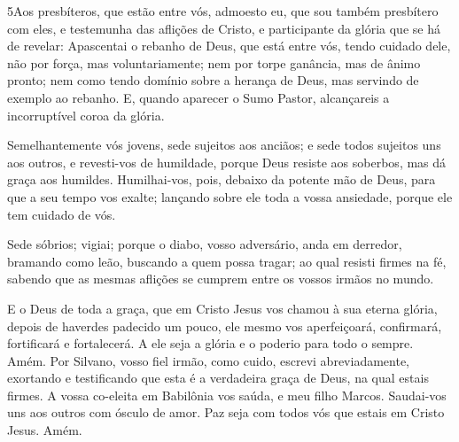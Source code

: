 \medskip

\lettrine{5} Aos presbíteros, que estão entre vós, admoesto
eu, que sou também presbítero com eles, e testemunha das aflições de
Cristo, e participante da glória que se há de revelar:
Apascentai o rebanho de Deus, que está entre vós, tendo cuidado
dele, não por força, mas voluntariamente; nem por torpe ganância,
mas de ânimo pronto; nem como tendo domínio sobre a herança de
Deus, mas servindo de exemplo ao rebanho. E, quando aparecer o
Sumo Pastor, alcançareis a incorruptível coroa da glória.

Semelhantemente vós jovens, sede sujeitos aos anciãos; e sede
todos sujeitos uns aos outros, e revesti-vos de humildade, porque
Deus resiste aos soberbos, mas dá graça aos humildes.
Humilhai-vos, pois, debaixo da potente mão de Deus, para que a
seu tempo vos exalte; lançando sobre ele toda a vossa ansiedade,
porque ele tem cuidado de vós.

Sede sóbrios; vigiai; porque o diabo, vosso adversário, anda em
derredor, bramando como leão, buscando a quem possa tragar; ao
qual resisti firmes na fé, sabendo que as mesmas aflições se cumprem
entre os vossos irmãos no mundo.

E o Deus de toda a graça, que em Cristo Jesus vos chamou à sua
eterna glória, depois de haverdes padecido um pouco, ele mesmo vos
aperfeiçoará, confirmará, fortificará e fortalecerá. A ele
seja a glória e o poderio para todo o sempre. Amém. Por
Silvano, vosso fiel irmão, como cuido, escrevi abreviadamente,
exortando e testificando que esta é a verdadeira graça de Deus, na
qual estais firmes. A vossa co-eleita em Babilônia vos saúda,
e meu filho Marcos. Saudai-vos uns aos outros com ósculo de
amor. Paz seja com todos vós que estais em Cristo Jesus. Amém.

